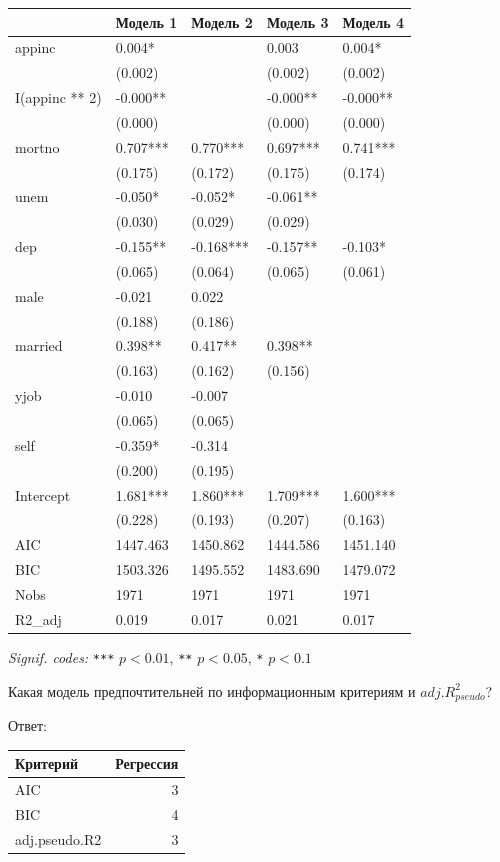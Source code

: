 \documentclass[
  russian,
]{article}
\newcounter{none} %
\begin{document}
{\def\LTcaptype{none} %
\begin{longtable}[]{@{}lllll@{}}
\toprule\noalign{}
& Модель 1 & Модель 2 & Модель 3 & Модель 4 \\
\midrule\noalign{}
\endhead
\bottomrule\noalign{}
\endlastfoot
appinc & 0.004* & & 0.003 & 0.004* \\
& (0.002) & & (0.002) & (0.002) \\
I(appinc ** 2) & -0.000** & & -0.000** & -0.000** \\
& (0.000) & & (0.000) & (0.000) \\
mortno & 0.707*** & 0.770*** & 0.697*** & 0.741*** \\
& (0.175) & (0.172) & (0.175) & (0.174) \\
unem & -0.050* & -0.052* & -0.061** & \\
& (0.030) & (0.029) & (0.029) & \\
dep & -0.155** & -0.168*** & -0.157** & -0.103* \\
& (0.065) & (0.064) & (0.065) & (0.061) \\
male & -0.021 & 0.022 & & \\
& (0.188) & (0.186) & & \\
married & 0.398** & 0.417** & 0.398** & \\
& (0.163) & (0.162) & (0.156) & \\
yjob & -0.010 & -0.007 & & \\
& (0.065) & (0.065) & & \\
self & -0.359* & -0.314 & & \\
& (0.200) & (0.195) & & \\
Intercept & 1.681*** & 1.860*** & 1.709*** & 1.600*** \\
& (0.228) & (0.193) & (0.207) & (0.163) \\
AIC & 1447.463 & 1450.862 & 1444.586 & 1451.140 \\
BIC & 1503.326 & 1495.552 & 1483.690 & 1479.072 \\
Nobs & 1971 & 1971 & 1971 & 1971 \\
R2\_adj & 0.019 & 0.017 & 0.021 & 0.017 \\
\end{longtable}
}

\emph{Signif. codes:} \texttt{***} \(p<0.01\), \texttt{**} \(p<0.05\),
\texttt{*} \(p<0.1\)

Какая модель предпочтительней по информационным критериям и
\(adj.R^2_{pseudo}\)?

Ответ:

{\def\LTcaptype{none} %
\begin{longtable}[]{@{}lr@{}}
\toprule\noalign{}
Критерий & Регрессия \\
\midrule\noalign{}
\endhead
\bottomrule\noalign{}
\endlastfoot
AIC & 3 \\
BIC & 4 \\
adj.pseudo.R2 & 3 \\
\end{longtable}
}
\end{document}
